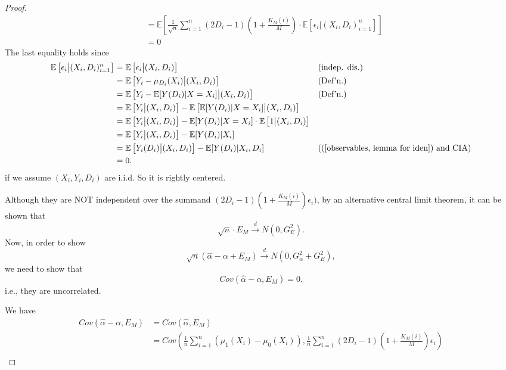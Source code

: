 \documentclass[11pt,a4paper]{amsart}
\theoremstyle{plain}
\theoremstyle{definition}
\begin{document}
\begin{proof}
\[\begin{aligned}
			&= \mathbb{E}\left[\frac{1}{\sqrt{n}} \sum_{i=1}^{n}(2D_{i}-1)(1+\frac{K_{M}(i)}{M})\cdot \mathbb{E}\left[\epsilon_{i} \big| (X_{i},D_{i})_{i=1}^{n}\right] \right]	\\
			&= 0
		\end{aligned}	\]
		The last equality holds since 
			\[	\begin{aligned}
			\mathbb{E}\left[\epsilon_{i} \big| (X_{i},D_{i})_{i=1}^{n}\right] &= \mathbb{E}\left[\epsilon_{i} \big| (X_{i},D_{i})\right] &&\text{(indep. dis.)}	\\
			&= \mathbb{E}\left[Y_{i} - \mu_{D_{i}}(X_{i}) \big| (X_{i},D_{i})\right]	
			 &&\text{(Def'n.)}\\
			&= \mathbb{E}\left[Y_{i} - \mathbb{E}[Y(D_{i})|X=X_{i}] \big| (X_{i},D_{i})\right] &&\text{(Def'n.)}\\
			&=  \mathbb{E}\left[Y_{i} \big| (X_{i},D_{i})\right] - \mathbb{E}\left[ \mathbb{E}[Y(D_{i})|X=X_{i}] \big| (X_{i},D_{i})\right] \\
			&=  \mathbb{E}\left[Y_{i} \big| (X_{i},D_{i})\right] - \mathbb{E}[Y(D_{i})|X=X_{i}]  \cdot \mathbb{E}\left[ 1 \big| (X_{i},D_{i})\right] \\
			&= \mathbb{E}\left[Y_{i} \big| (X_{i},D_{i})\right] - \mathbb{E}[Y(D_{i})|X_{i}]	\\
			&=  \mathbb{E}\left[Y_{i}(D_{i}) \big| (X_{i},D_{i})\right] - \mathbb{E}[Y(D_{i})|X_{i},D_{i}] &&\text{((\ref{observables, lemma for iden}) and CIA)}	\\
			&= 0.
			\end{aligned}	\]
		 if we assume $(X_{i} ,Y_{i}, D_{i})$ are i.i.d. So it is rightly centered.\par 
		Although they are NOT independent over the summand $(2D_{i}-1)(1+\frac{K_{M}(i)}{M})\epsilon_{i})$, by an alternative central limit theorem, it can be shown that
		\[	\sqrt{n} \cdot E_{M} \stackrel{d}{\longrightarrow} N(0, G_{E}^{2}).	\]
		Now, in order to show 
		\[		\sqrt{n}(\hat{\alpha} - \alpha + E_{M}) \stackrel{d}{\longrightarrow} N(0,G_{\alpha}^{2} + G_{E}^{2}),	\]
		we need to show that 
		\[	Cov(\hat{\alpha}-\alpha, E_{M}) = 0.	\]
		i.e., they are uncorrelated.\par 
		We have
		\[	\begin{aligned}
			Cov (\hat{\alpha}-\alpha, E_{M}) &= Cov (\hat{\alpha}, E_{M}) \\
			&= Cov\left(\frac{1}{n}\sum_{i=1}^{n}(\mu_{1}(X_{i})-\mu_{0}(X_{i})), \frac{1}{n}\sum_{i=1}^{n}(2D_{i}-1)(1+\frac{K_{M}(i)}{M})\epsilon_{i}\right)\\

\end{aligned}\]
\end{proof}
\end{document}
